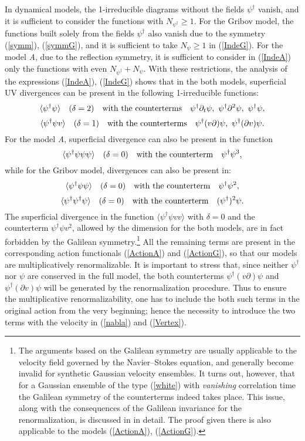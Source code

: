 \documentclass[12pt]{iopart}
\begin{document}
In dynamical models, the 1-irreducible diagrams without the fields
$\psi^{\dag}$ vanish, and it is sufficient to consider the functions
with $N_{\psi^{\dag}} \ge 1$. For the Gribov model, the functions built
solely from the fields $\psi^{\dag}$ also vanish due to the symmetry
(\ref{symm}), (\ref{symmG}), and it is sufficient to take $N_{\psi}\ge1$
in (\ref{IndeG}). For the model {\it A}, due to the reflection symmetry,
it is sufficient to consider in (\ref{IndeA}) only the functions with
even $N_{\psi^{\dag}}+N_{\psi}$. With these restrictions, the analysis of
the expressions (\ref{IndeA}), (\ref{IndeG}) shows that in the both
models, superficial UV divergences can be present in the following
1-irreducible functions:
\[ \langle \psi^{\dag} \psi \rangle \quad (\delta=2) \quad
{\rm with\ the\ counterterms} \quad \psi^{\dag}\partial_{t}\psi, \
\psi^{\dag}\partial^{2}\psi, \ \psi^{\dag}\psi, \]
\[ \langle \psi^{\dag} \psi v \rangle \quad (\delta=1) \quad
{\rm with\ the\ counterterms} \quad \psi^{\dag} (v\partial) \psi, \
\psi^{\dag} (\partial v) \psi.  \]
For the model {\it A}, superficial divergence can also be present in
the function
\[ \langle \psi^{\dag} \psi\psi\psi \rangle \quad (\delta=0) \quad
{\rm with\ the\ counterterm} \quad \psi^{\dag} \psi^{3}, \]
while for the Gribov model, divergences can also be present in:
\[ \langle \psi^{\dag} \psi\psi \rangle \quad (\delta=0) \quad
{\rm with\ the\ counterterm} \quad \psi^{\dag} \psi^{2}, \]
\[ \langle \psi^{\dag} \psi^{\dag}\psi \rangle \quad (\delta=0) \quad
{\rm with\ the\ counterterm} \quad (\psi^{\dag})^{2} \psi. \]
The superficial divergence in the function
$\langle \psi^{\dag} \psi vv \rangle$ with $\delta=0$ and the
counterterm $\psi^{\dag} \psi v^{2}$, allowed by the dimension
for the both models, are in fact forbidden by the Galilean
symmetry.\footnote{The arguments based on the Galilean symmetry are
usually applicable to the velocity field governed by the Navier--Stokes
equation, and generally become invalid for synthetic Gaussian velocity
ensembles. It turns out, however, that for a Gaussian ensemble of the type
(\ref{white}) with {\it vanishing} correlation time the Galilean symmetry
of the counterterms indeed takes place. This issue, along with the
consequences of the Galilean invariance for the renormalization, is
discussed in \cite{Alexa} in detail. The proof given there is also
applicable to the models (\ref{ActionA}), (\ref{ActionG}).}
All the remaining terms are present in the corresponding action functionals
(\ref{ActionA}) and (\ref{ActionG}), so that our models are multiplicatively
renormalizable. It is important to stress that, since neither $\psi^{\dag}$
nor $\psi$ are conserved in the full model, the both counterterms
$\psi^{\dag} (v\partial) \psi$  and $\psi^{\dag} (\partial v) \psi$
will be generated by the renormalization procedure. Thus to ensure the
multiplicative renormalizability, one has to include the both such
terms in the original action from the very beginning; hence the
necessity to introduce the two terms with the velocity in (\ref{nabla})
and (\ref{Vertex}).
\end{document}

